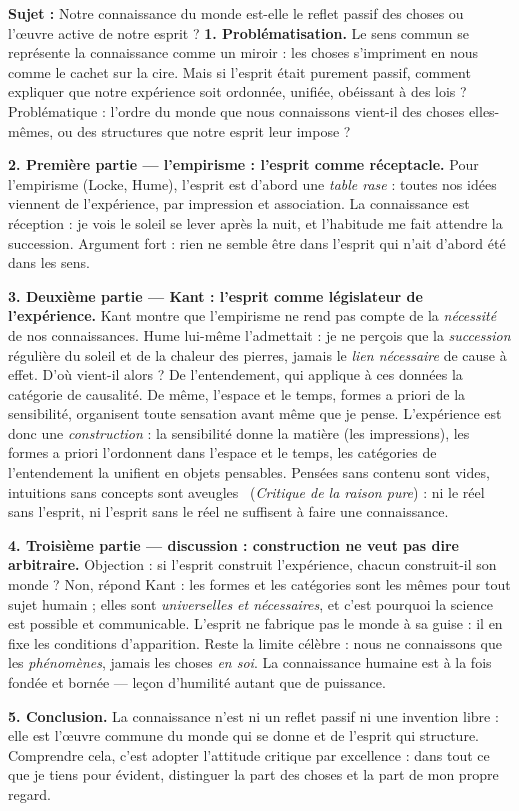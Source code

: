 \documentclass[11pt]{article}
\newcommand{\cle}[1]{{\popxbold\color{popdark}#1}}
\begin{document}
\begin{exoresolu}
\textbf{Sujet :} Notre connaissance du monde est-elle le reflet passif des choses ou l'œuvre active de notre esprit ?
\tcblower
\textbf{1. Problématisation.} Le sens commun se représente la connaissance comme un miroir : les choses s'impriment en nous comme le cachet sur la cire. Mais si l'esprit était purement passif, comment expliquer que notre expérience soit ordonnée, unifiée, obéissant à des lois ? Problématique : l'ordre du monde que nous connaissons vient-il des choses elles-mêmes, ou des structures que notre esprit leur impose ?

\textbf{2. Première partie --- l'empirisme : l'esprit comme réceptacle.} Pour l'empirisme (Locke, Hume), l'esprit est d'abord une \emph{table rase} : toutes nos idées viennent de l'expérience, par impression et association. La connaissance est réception : je vois le soleil se lever après la nuit, et l'habitude me fait attendre la succession. Argument fort : rien ne semble être dans l'esprit qui n'ait d'abord été dans les sens.

\textbf{3. Deuxième partie --- Kant : l'esprit comme législateur de l'expérience.} Kant montre que l'empirisme ne rend pas compte de la \emph{nécessité} de nos connaissances. Hume lui-même l'admettait : je ne perçois que la \emph{succession} régulière du soleil et de la chaleur des pierres, jamais le \emph{lien nécessaire} de cause à effet. D'où vient-il alors ? De l'entendement, qui applique à ces données la \cle{catégorie} de causalité. De même, l'espace et le temps, formes a priori de la sensibilité, organisent toute sensation avant même que je pense. L'expérience est donc une \emph{construction} : la sensibilité donne la matière (les impressions), les formes a priori l'ordonnent dans l'espace et le temps, les catégories de l'entendement la unifient en objets pensables. \guillemotleft Pensées sans contenu sont vides, intuitions sans concepts sont aveugles \guillemotright\ (\emph{Critique de la raison pure}) : ni le réel sans l'esprit, ni l'esprit sans le réel ne suffisent à faire une connaissance.

\textbf{4. Troisième partie --- discussion : construction ne veut pas dire arbitraire.} Objection : si l'esprit construit l'expérience, chacun construit-il son monde ? Non, répond Kant : les formes et les catégories sont les mêmes pour tout sujet humain ; elles sont \emph{universelles et nécessaires}, et c'est pourquoi la science est possible et communicable. L'esprit ne fabrique pas le monde à sa guise : il en fixe les conditions d'apparition. Reste la limite célèbre : nous ne connaissons que les \emph{phénomènes}, jamais les choses \emph{en soi}. La connaissance humaine est à la fois fondée et bornée --- leçon d'humilité autant que de puissance.

\textbf{5. Conclusion.} La connaissance n'est ni un reflet passif ni une invention libre : elle est l'œuvre commune du monde qui se donne et de l'esprit qui structure. Comprendre cela, c'est adopter l'attitude critique par excellence : dans tout ce que je tiens pour évident, distinguer la part des choses et la part de mon propre regard.
\end{exoresolu}
\end{document}
